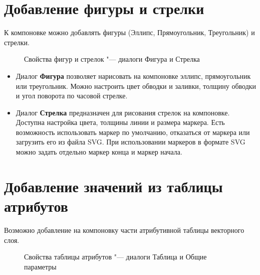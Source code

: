\section{Добавление фигуры и стрелки}

К компоновке можно добавлять фигуры (Эллипс, Прямоугольник, Треугольник)
и стрелки.

\begin{figure}[ht]
\centering
{}
\hspace{1cm}
\caption{Свойства фигур и стрелок "--- диалоги Фигура и Стрелка \wincaption}\label{fig:shapearrow}
\end{figure}

\begin{itemize}[label=--]
\item Диалог \textbf{Фигура} позволяет нарисовать на компоновке эллипс,
прямоугольник или треугольник. Можно настроить цвет обводки и заливки,
толщину обводки и угол поворота по часовой стрелке.
\item Диалог \textbf{Стрелка} предназначен для рисования стрелок на
компоновке. Доступна настройка цвета, толщины линии и размера маркера.
Есть возможность использовать маркер по умолчанию, отказаться от маркера
или загрузить его из файла SVG. При использовании маркеров в формате SVG
можно задать отдельно маркер конца и маркер начала.
\end{itemize}

\section{Добавление значений из таблицы атрибутов}

Возможно добавление на компоновку части атрибутивной таблицы векторного
слоя.

\begin{figure}[ht]
\centering
{}
\hspace{1cm}
\caption{Свойства таблицы атрибутов "--- диалоги Таблица и Общие параметры \wincaption}\label{fig:attrcomp}
\end{figure}

